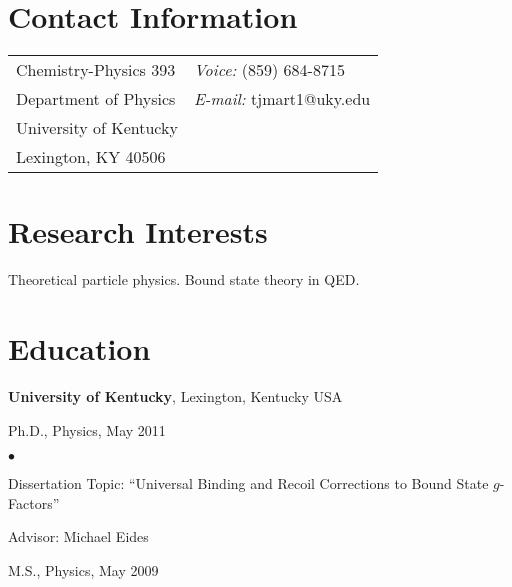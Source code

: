 \documentclass[margin,line]{res}
\newenvironment{list1}{
  \begin{list}{\ding{113}}{%
      \setlength{\itemsep}{0in}
      \setlength{\parsep}{0in} \setlength{\parskip}{0in}
      \setlength{\topsep}{0in} \setlength{\partopsep}{0in} 
      \setlength{\leftmargin}{0.17in}}}{\end{list}}
\newenvironment{list2}{
  \begin{list}{$\bullet$}{%
      \setlength{\itemsep}{0in}
      \setlength{\parsep}{0in} \setlength{\parskip}{0in}
      \setlength{\topsep}{0in} \setlength{\partopsep}{0in} 
      \setlength{\leftmargin}{0.2in}}}{\end{list}}
\begin{document}

\begin{resume}
\section{\sc Contact Information}
\vspace{.05in}
\begin{tabular}{@{}p{2in}p{4in}}
Chemistry-Physics 393            & {\it Voice:}  (859) 684-8715 \\            
Department of Physics   & {\it E-mail:}  tjmart1@uky.edu\\         
University of Kentucky & \\    
Lexington, KY 40506  &     \\
\end{tabular}


\section{\sc Research Interests}
Theoretical particle physics.  Bound state theory in QED.

\section{\sc Education}
{\bf University of Kentucky}, Lexington, Kentucky USA\\
\vspace*{-.1in}
\begin{list1}
\item[] Ph.D., Physics, May 2011
\begin{list2}
\vspace*{.05in}
\item Dissertation Topic:  ``Universal Binding and Recoil Corrections to Bound State $g$-Factors''
\item Advisor:  Michael Eides
\end{list2}
\vspace*{.05in}
\item[] M.S., Physics,  May 2009
\end{list1}


\end{resume}
\end{document}
